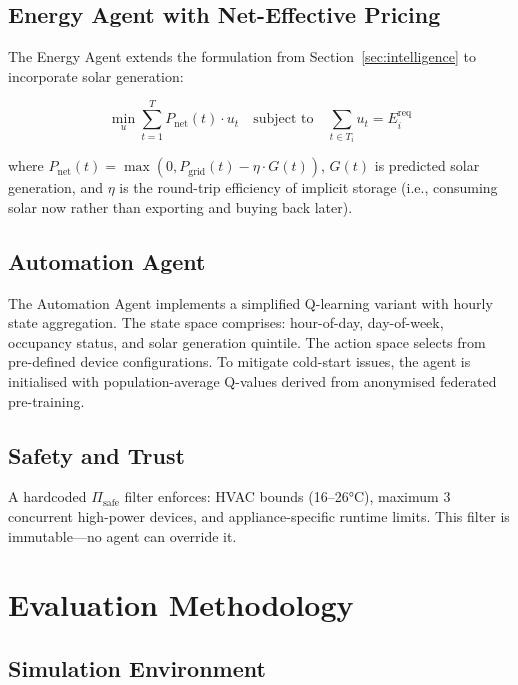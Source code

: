 \documentclass[11pt,a4paper]{article}
\begin{document}
\subsection{Energy Agent with Net-Effective Pricing}

The Energy Agent extends the formulation from Section~\ref{sec:intelligence} to incorporate solar generation:

\begin{equation}
\min_{u} \sum_{t=1}^{T} P_{\text{net}}(t) \cdot u_t \quad \text{subject to} \quad \sum_{t \in T_i} u_t = E_i^{\text{req}}
\end{equation}

where $P_{\text{net}}(t) = \max(0, P_{\text{grid}}(t) - \eta \cdot G(t))$, $G(t)$ is predicted solar generation, and $\eta$ is the round-trip efficiency of implicit storage (i.e., consuming solar now rather than exporting and buying back later).

\subsection{Automation Agent}

The Automation Agent implements a simplified Q-learning variant with hourly state aggregation. The state space comprises: hour-of-day, day-of-week, occupancy status, and solar generation quintile. The action space selects from pre-defined device configurations. To mitigate cold-start issues, the agent is initialised with population-average Q-values derived from anonymised federated pre-training.

\subsection{Safety and Trust}

A hardcoded $\Pi_{\text{safe}}$ filter enforces: HVAC bounds (16--26°C), maximum 3 concurrent high-power devices, and appliance-specific runtime limits. This filter is immutable---no agent can override it.

\section{Evaluation Methodology}
\label{sec:evaluation}

\subsection{Simulation Environment}
\end{document}
